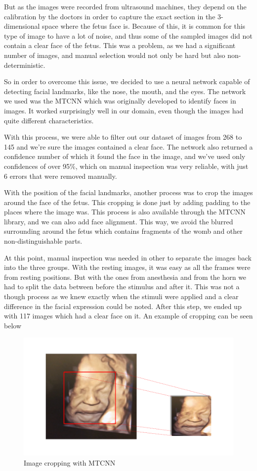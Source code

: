 But as the images were recorded from ultrasound machines, they depend on the calibration by the doctors in order to capture the exact section in the 3-dimensional space where the fetus face is. Because of this, it is common for this type of image to have a lot of noise, and thus some of the sampled images did not contain a clear face of the fetus. This was a problem, as we had a significant number of images, and manual selection would not only be hard but also non-deterministic.

So in order to overcome this issue, we decided to use a neural network capable of detecting facial landmarks, like the nose, the mouth, and the eyes. The network we used was the MTCNN \cite{ZhangZL016} which was originally developed to identify faces in images. It worked surprisingly well in our domain, even though the images had quite different characteristics.

With this process, we were able to filter out our dataset of images from 268 to 145 and we're sure the images contained a clear face. The network also returned a confidence number of which it found the face in the image, and we've used only confidences of over 95\%, which on manual inspection was very reliable, with just 6 errors that were removed manually.

With the position of the facial landmarks, another process was to crop the images around the face of the fetus. This cropping is done just by adding padding to the places where the image was. This process is also available through the MTCNN library, and we can also add face alignment. This way, we avoid the blurred surrounding around the fetus which contains fragments of the womb and other non-distinguishable parts. 

At this point, manual inspection was needed in other to separate the images back into the three groups. With the resting images, it was easy as all the frames were from resting positions. But with the ones from anesthesia and from the horn we had to split the data between before the stimulus and after it. This was not a though process as we knew exactly when the stimuli were applied and a clear difference in the facial expression could be noted. After this step, we ended up with 117 images which had a clear face on it. An example of cropping can be seen below

\begin{figure}[h!tp]
    \centering
    \includegraphics[width=.9\textwidth]{imgs/chap3_cropping.png}
    \caption{Image cropping with MTCNN}
    \label{fig:cropping}
\end{figure}

